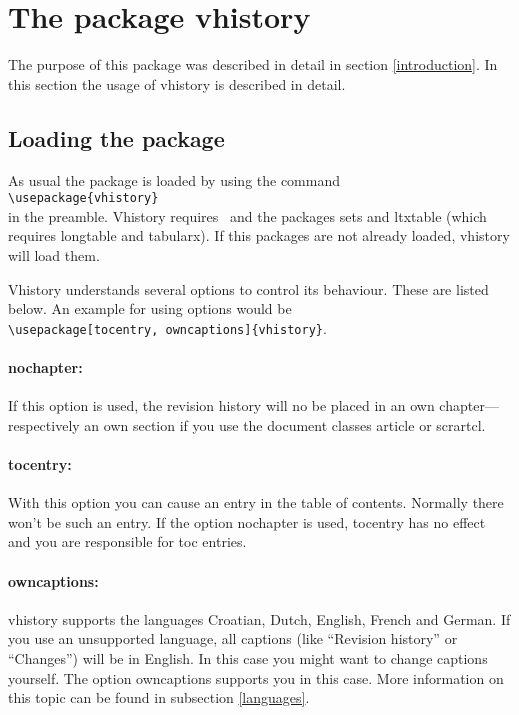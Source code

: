 \section{The package vhistory}

The purpose of this package was described in detail in section \ref{introduction}.
In this section the usage of vhistory is described in detail.

\subsection{Loading the package}\label{load}
As usual the package is loaded by using the command\\
\mbox{}\hspace{2em}\verb|\usepackage{vhistory}|\\
in the preamble. Vhistory requires \LaTeXe\ and the packages sets and ltxtable (which requires longtable and tabularx). If this packages are not already loaded, vhistory will load them.

Vhistory understands several options to control its behaviour. These are listed below. An example for using options would be\\
\mbox{}\hspace{2em}\verb|\usepackage[tocentry, owncaptions]{vhistory}|.

\paragraph{nochapter:} If this option is used, the revision history will no be placed in an own chapter---respectively an own section if you use the document classes article or scrartcl.

\paragraph{tocentry:} With this option you can cause an entry in the table of contents. Normally there won't be such an entry. If the option nochapter is used, tocentry has no effect and you are responsible for toc entries.

\paragraph{owncaptions:} vhistory supports the languages Croatian, Dutch, English, French and German. If you use an unsupported language, all captions (like ``Revision history'' or ``Chan\-ges'') will be in English. In this case you might want to change captions yourself. The option own\-capt\-ions supports you in this case. More information on this topic can be found in subsection \ref{languages}.

